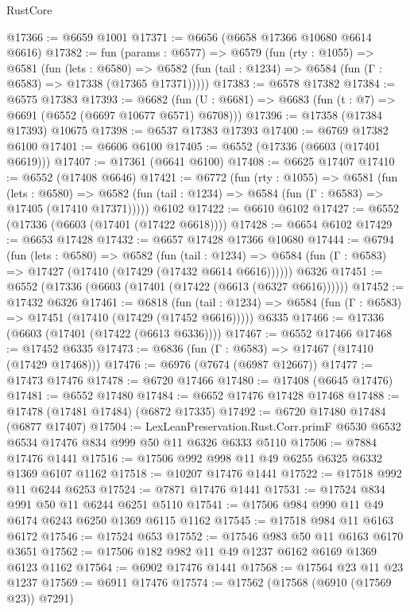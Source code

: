 \begin{lexlean}{RustCore}
\begin{coremodule}
@17366 := @6659 @1001
@17371 := @6656 (@6658 @17366 @10680 @6614 @6616)
@17382 := fun (params : @6577) =>
  @6579
    (fun (rty : @1055) =>
    @6581
      (fun (lets : @6580) =>
      @6582 (fun (tail : @1234) => @6584 (fun (Γ : @6583) => @17338 (@17365 @17371)))))
@17383 := @6578 @17382
@17384 := @6575 @17383
@17393 := @6682
    (fun (U : @6681) => @6683 (fun (t : @7) => @6691 (@6552 (@6697 @10677 @6571) @6708)))
@17396 := @17358 (@17384 @17393) @10675
@17398 := @6537 @17383 @17393
@17400 := @6769 @17382 @6100
@17401 := @6606 @6100
@17405 := @6552 (@17336 (@6603 (@17401 @6619)))
@17407 := @17361 (@6641 @6100)
@17408 := @6625 @17407
@17410 := @6552 (@17408 @6646)
@17421 := @6772
    (fun (rty : @1055) =>
    @6581
      (fun (lets : @6580) =>
      @6582 (fun (tail : @1234) => @6584 (fun (Γ : @6583) => @17405 (@17410 @17371)))))
    @6102
@17422 := @6610 @6102
@17427 := @6552 (@17336 (@6603 (@17401 (@17422 @6618))))
@17428 := @6654 @6102
@17429 := @6653 @17428
@17432 := @6657 @17428 @17366 @10680
@17444 := @6794
    (fun (lets : @6580) =>
    @6582
      (fun (tail : @1234) =>
      @6584 (fun (Γ : @6583) => @17427 (@17410 (@17429 (@17432 @6614 @6616))))))
    @6326
@17451 := @6552 (@17336 (@6603 (@17401 (@17422 (@6613 (@6327 @6616))))))
@17452 := @17432 @6326
@17461 := @6818
    (fun (tail : @1234) => @6584 (fun (Γ : @6583) => @17451 (@17410 (@17429 (@17452 @6616)))))
    @6335
@17466 := @17336 (@6603 (@17401 (@17422 (@6613 @6336))))
@17467 := @6552 @17466
@17468 := @17452 @6335
@17473 := @6836 (fun (Γ : @6583) => @17467 (@17410 (@17429 @17468)))
@17476 := @6976 (@7674 (@6987 @12667))
@17477 := @17473 @17476
@17478 := @6720 @17466
@17480 := @17408 (@6645 @17476)
@17481 := @6552 @17480
@17484 := @6652 @17476 @17428 @17468
@17488 := @17478 (@17481 @17484) (@6872 @17335)
@17492 := @6720 @17480 @17484 (@6877 @17407)
@17504 := LexLeanPreservation.Rust.Corr.primF
    @6530
    @6532
    @6534
    @17476
    @834
    @999
    @50
    @11
    @6326
    @6333
    @5110
@17506 := @7884 @17476 @1441
@17516 := @17506 @992 @998 @11 @49 @6255 @6325 @6332 @1369 @6107 @1162
@17518 := @10207 @17476 @1441
@17522 := @17518 @992 @11 @6244 @6253
@17524 := @7871 @17476 @1441
@17531 := @17524 @834 @991 @50 @11 @6244 @6251 @5110
@17541 := @17506 @984 @990 @11 @49 @6174 @6243 @6250 @1369 @6115 @1162
@17545 := @17518 @984 @11 @6163 @6172
@17546 := @17524 @653
@17552 := @17546 @983 @50 @11 @6163 @6170 @3651
@17562 := @17506 @182 @982 @11 @49 @1237 @6162 @6169 @1369 @6123 @1162
@17564 := @6902 @17476 @1441
@17568 := @17564 @23 @11 @23 @1237
@17569 := @6911 @17476
@17574 := @17562 (@17568 (@6910 (@17569 @23)) @7291)

\end{coremodule}
\end{lexlean}
